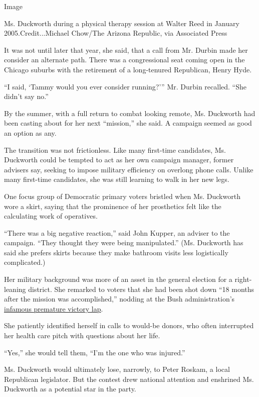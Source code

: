 Image

Ms. Duckworth during a physical therapy session at Walter Reed in
January 2005.Credit...Michael Chow/The Arizona Republic, via Associated
Press

It was not until later that year, she said, that a call from Mr. Durbin
made her consider an alternate path. There was a congressional seat
coming open in the Chicago suburbs with the retirement of a long-tenured
Republican, Henry Hyde.

``I said, `Tammy would you ever consider running?''' Mr. Durbin
recalled. ``She didn't say no.''

By the summer, with a full return to combat looking remote, Ms.
Duckworth had been casting about for her next ``mission,'' she said. A
campaign seemed as good an option as any.

The transition was not frictionless. Like many first-time candidates,
Ms. Duckworth could be tempted to act as her own campaign manager,
former advisers say, seeking to impose military efficiency on overlong
phone calls. Unlike many first-time candidates, she was still learning
to walk in her new legs.

One focus group of Democratic primary voters bristled when Ms. Duckworth
wore a skirt, saying that the prominence of her prosthetics felt like
the calculating work of operatives.

``There was a big negative reaction,'' said John Kupper, an adviser to
the campaign. ``They thought they were being manipulated.'' (Ms.
Duckworth has said she prefers skirts because they make bathroom visits
less logistically complicated.)

Her military background was more of an asset in the general election for
a right-leaning district. She remarked to voters that she had been shot
down ``18 months after the mission was accomplished,'' nodding at the
Bush administration's
\href{https://www.nytimes.com/2003/10/29/world/bush-steps-away-from-victory-banner.html}{infamous
premature victory lap}.

She patiently identified herself in calls to would-be donors, who often
interrupted her health care pitch with questions about her life.

``Yes,'' she would tell them, ``I'm the one who was injured.''

Ms. Duckworth would ultimately lose, narrowly, to Peter Roskam, a local
Republican legislator. But the contest drew national attention and
enshrined Ms. Duckworth as a potential star in the party.


